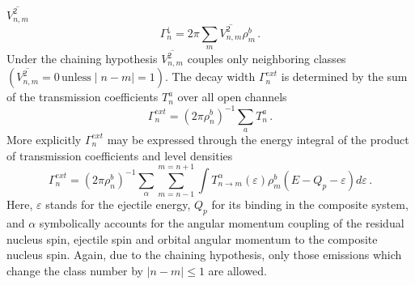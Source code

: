 $\overline{V_{n,m}^{2}}$
\begin{equation}
\Gamma_{n}^{\downarrow}=2\pi\sum_{m}\overline{V_{n,m}^{2}}\rho_{m}^{b}\,.
\label{GdownMSC}
\end{equation}
Under the chaining hypothesis $\overline{V_{n,m}^{2}}$ couples only
neighboring classes $(\overline{V_{n,m}^{2}}=0\,{\text{unless}}\mid
n-m\mid=1)$. The decay width $\Gamma_{n}^{ext}$ is determined by the sum of
the transmission coefficients $T_{n}^{a}$ over all open channels
\begin{equation}
\Gamma_{n}^{ext}=(2\pi\rho_{n}^{b})^{-1}\sum_{a}T_{n}^{a}\,.
\end{equation}
More explicitly $\Gamma_{n}^{ext}$ may be expressed through the energy
integral of the product of transmission coefficients and level densities%
\begin{equation}
\Gamma_{n}^{ext}=(2\pi\rho_{n}^{b})^{-1}\sum_{\alpha}\sum_{m=n-1}^{m=n+1}%
\int T_{n\rightarrow
m}^{\alpha}(\varepsilon)\rho_{m}^{b}(E-Q_{p}-\varepsilon)d\varepsilon\,.
\label{Gammext}
\end{equation}
Here, $\varepsilon$ stands for the ejectile energy, $Q_{p}$ for its
binding in the composite system, and $\alpha$ symbolically accounts for the
angular momentum coupling of the residual nucleus spin, ejectile spin and
orbital angular momentum to the composite nucleus spin. Again, due to the
chaining hypothesis, only those emissions which change the
class number by $\mid n-m\mid\leq1$ are allowed.

